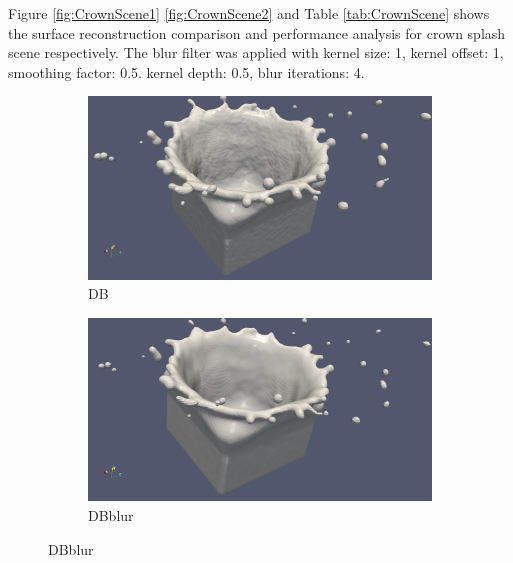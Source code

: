 Figure \ref{fig:CrownScene1} \ref{fig:CrownScene2} and Table \ref{tab:CrownScene} shows the surface reconstruction comparison  and performance analysis for crown splash scene respectively. The blur filter was applied with kernel size: 1, kernel offset: 1, smoothing factor: 0.5. kernel depth: 0.5, blur iterations: 4.
\begin{figure}
	\begin{center}
        \begin{subfigure}[b]{\textwidth}
               \includegraphics[width=\textwidth]{figures/CrownOriginal.png}
				\caption{DB}
        \end{subfigure}
        \begin{subfigure}[b]{\textwidth}
               \includegraphics[width=\textwidth]{figures/CrownBlurred.png}
				\caption{DBblur}
        \end{subfigure}
	\end{center}
\end{figure}
